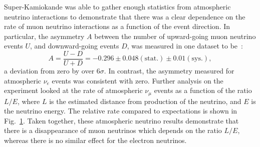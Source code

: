 Super-Kamiokande was able to gather enough statistics from atmospheric neutrino interactions to demonstrate that there was a clear dependence on the rate of muon neutrino interactions as a function of the event direction. In particular, the asymmetry $A$ between the number of upward-going muon neutrino events $U$, and downward-going events $D$, was measured in one dataset to be~\cite{}: %
\begin{equation*}
    A = \frac{U-D}{U+D} = -0.296 \pm 0.048(\mathrm{stat.}) \pm 0.01(\mathrm{sys.}),
\end{equation*}
a deviation from zero by over 6$\sigma$. In contrast, the asymmetry measured for atmospheric $\nu_{e}$ events was consistent with zero. Further analysis on the experiment looked at the rate of atmospheric $\nu_{\mu}$ events as a function of the ratio $L/E$, where $L$ is the estimated distance from production of the neutrino, and $E$ is the neutrino energy. The relative rate compared to expectations is shown in Fig.~\ref{fig:LE_plot_SK_atmos}. Taken together, these atmospheric neutrino results demonstrate that there is a disappearance of muon neutrinos which depends on the ratio $L/E$, whereas there is no similar effect for the electron neutrinos.

\begin{figure}
    \centering
    \begin{subfigure}{0.48\textwidth}
        \centering
        \caption{}
        \label{fig:LE_plot_SK_atmos}
    \end{subfigure}
    \begin{subfigure}{0.48\textwidth}
        \centering
        \caption{}
        \label{fig:LE_plot_KamLAND_antinu}
    \end{subfigure}
    \begin{subfigure}{0.48\textwidth}
        \centering
        \caption{}
        \label{fig:LE_plot_DayaBay}
    \end{subfigure}
    \begin{subfigure}{0.48\textwidth}
        \centering
        \caption{}
        \label{fig:LE_plot_T2K_numu}
    \end{subfigure}
    \caption[]
    {}
    \label{fig:LE_plots}
\end{figure}

